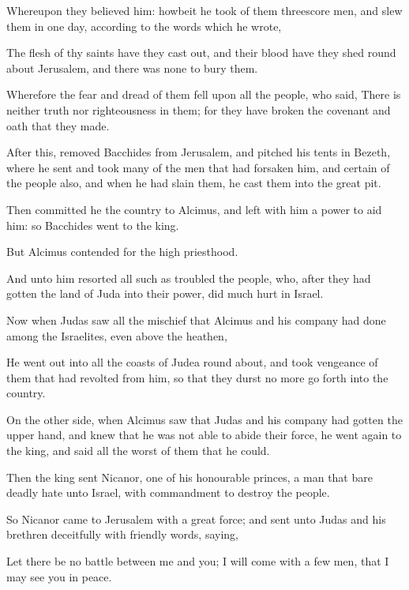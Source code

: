 {\par }{\PP {}Whereupon they believed him: howbeit he took of them threescore men, and slew them in one day, according to the words which he wrote,
\par }{\PP {}The flesh of thy saints have they cast out, and their blood have they shed round about Jerusalem, and there was none to bury them.
\par }{\PP {}Wherefore the fear and dread of them fell upon all the people, who said, There is neither truth nor righteousness in them; for they have broken the covenant and oath that they made.
\par }{\PP {}After this, removed Bacchides from Jerusalem, and pitched his tents in Bezeth, where he sent and took many of the men that had forsaken him, and certain of the people also, and when he had slain them, he cast them into the great pit.
\par }{\PP {}Then committed he the country to Alcimus, and left with him a power to aid him: so Bacchides went to the king.
\par }{\PP {}But Alcimus contended for the high priesthood.
\par }{\PP {}And unto him resorted all such as troubled the people, who, after they had gotten the land of Juda into their power, did much hurt in Israel.
\par }{\PP {}Now when Judas saw all the mischief that Alcimus and his company had done among the Israelites, even above the heathen,
\par }{\PP {}He went out into all the coasts of Judea round about, and took vengeance of them that had revolted from him, so that they durst no more go forth into the country.
\par }{\PP {}On the other side, when Alcimus saw that Judas and his company had gotten the upper hand, and knew that he was not able to abide their force, he went again to the king, and said all the worst of them that he could.
\par }{\PP {}Then the king sent Nicanor, one of his honourable princes, a man that bare deadly hate unto Israel, with commandment to destroy the people.
\par }{\PP {}So Nicanor came to Jerusalem with a great force; and sent unto Judas and his brethren deceitfully with friendly words, saying,
\par }{\PP {}Let there be no battle between me and you; I will come with a few men, that I may see you in peace.
}
